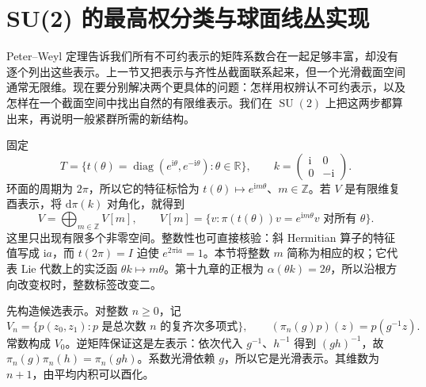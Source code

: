 
% 
% 
% 

\section{SU(2) 的最高权分类与球面线丛实现}
\label{g1:sec:2004}

Peter--Weyl 定理告诉我们所有不可约表示的矩阵系数合在一起足够丰富，却没有逐个列出这些表示。上一节又把表示与齐性丛截面联系起来，但一个光滑截面空间通常无限维。现在要分别解决两个更具体的问题：怎样用权辨认不可约表示，以及怎样在一个截面空间中找出自然的有限维表示。我们在 \(\operatorname{SU}(2)\) 上把这两步都算出来，再说明一般紧群所需的新结构。

\ProseParagraphBreak

固定
\[
	T=\{t(\theta)=\operatorname{diag}(e^{\mathrm{i}\theta},e^{-\mathrm{i}\theta}):\theta\in\mathbb R\},
	\qquad k=\begin{pmatrix}\mathrm{i}&0\\0&-\mathrm{i}\end{pmatrix}.
\]
环面的周期为 \(2\pi\)，所以它的特征标恰为 \(t(\theta)\mapsto e^{\mathrm{i}m\theta}\)、\(m\in\mathbb Z\)。若 \(V\) 是有限维复酉表示，将 \(\mathrm{d}\pi(k)\) 对角化，就得到
\[
	V=\bigoplus_{m\in\mathbb Z}V[m],\qquad
	V[m]=\{v:\pi(t(\theta))v=e^{\mathrm{i}m\theta}v\text{ 对所有 }\theta\}.
\]
这里只出现有限多个非零空间。整数性也可直接核验：斜 Hermitian 算子的特征值写成 \(\mathrm{i}a\)，而 \(t(2\pi)=I\) 迫使 \(e^{2\pi\mathrm{i}a}=1\)。本节将整数 \(m\) 简称为相应的权；它代表 Lie 代数上的实泛函 \(\theta k\mapsto m\theta\)。第十九章的正根为 \(\alpha(\theta k)=2\theta\)，所以沿根方向改变权时，整数标签改变二。

\ProseParagraphBreak

先构造候选表示。对整数 \(n\ge0\)，记
\[
	V_n=\{p(z_0,z_1):p\text{ 是总次数 }n\text{ 的复齐次多项式}\},
	\qquad (\pi_n(g)p)(z)=p(g^{-1}z).
\]
常数构成 \(V_0\)。逆矩阵保证这是左表示：依次代入 \(g^{-1}\)、\(h^{-1}\) 得到 \((gh)^{-1}\)，故 \(\pi_n(g)\pi_n(h)=\pi_n(gh)\)。系数光滑依赖 \(g\)，所以它是光滑表示。其维数为 \(n+1\)，由平均内积可以酉化。

